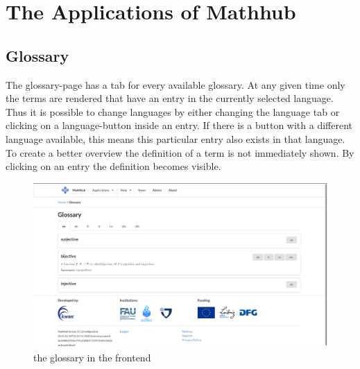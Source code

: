 \documentclass[11pt,a4paper]{article}
\begin{document}
\section{The Applications of Mathhub}

\subsection{Glossary}
The glossary-page has a tab for every available glossary.
At any given time only the terms are rendered that have an entry in the currently selected language.
Thus it is possible to change languages by either changing the language tab or clicking on a language-button inside an entry.
If there is a button with a different language available, this means this particular entry also exists in that language.
To create a better overview the definition of a term is not immediately shown.
By clicking on an entry the definition becomes visible.
\begin{figure}[H]
\includegraphics[width=1\textwidth]{glossary.png}
\caption{the glossary in the frontend}
\end{figure}
\end{document}
